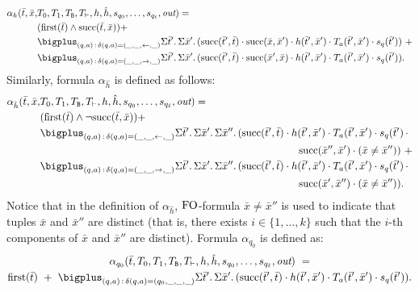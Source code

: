 \begin{align*}
\alpha_{h}(\bar{t},\bar{x},&T_0,T_1,T_{\ttB},T_{\vdash},h,\hat{h},s_{q_0},\ldots,s_{q_{\ell}},\out) = \\
&(\first(\bar{t}) \wedge \successor(\bar{t},\bar{x})) + \\
&\bigplus_{(q,a) \,:\, \delta(q,a) = (\_,\_,\leftarrow,\_)}\sa{\bar{t}'}\sa{\bar{x}'}(\successor(\bar{t}',\bar{t}) \mult \successor(\bar{x},\bar{x}')\mult h(\bar{t}',\bar{x}') \mult T_a(\bar{t}',\bar{x}') \mult s_{q}(\bar{t}')) \ + \\
&\bigplus_{(q,a) \,:\, \delta(q,a) = (\_,\_,\rightarrow,\_)}\sa{\bar{t}'}\sa{\bar{x}'}(\successor(\bar{t}',\bar{t}) \mult \successor(\bar{x}',\bar{x})\mult h(\bar{t}',\bar{x}') \mult T_a(\bar{t}',\bar{x}') \mult s_{q}(\bar{t}')).
\end{align*}
Similarly, formula $\alpha_{\hat{h}}$ is defined as follows:
\begin{align*}
\alpha_{\hat{h}}(\bar{t},\bar{x},&T_0,T_1,T_{\ttB},T_{\vdash},h,\hat{h},s_{q_0},\ldots,s_{q_{\ell}},\out) = \\
&(\first(\bar{t}) \wedge \neg\successor(\bar{t},\bar{x})) + \\
&\bigplus_{(q,a) \,:\, \delta(q,a) = (\_,\_,\leftarrow,\_)}\sa{\bar{t}'}\sa{\bar{x}'}\sa{\bar{x}''}(\successor(\bar{t}',\bar{t}) \mult h(\bar{t}',\bar{x}') \mult T_a(\bar{t}',\bar{x}') \mult s_{q}(\bar{t}') \, \mult \\
&\hspace{250pt} \successor(\bar{x}'',\bar{x}') \mult (\bar{x} \neq \bar{x}'')) \ + \\
&\bigplus_{(q,a) \,:\, \delta(q,a) = (\_,\_,\rightarrow,\_)}\sa{\bar{t}'}\sa{\bar{x}'}\sa{\bar{x}''}(\successor(\bar{t}',\bar{t}) \mult h(\bar{t}',\bar{x}') \mult T_a(\bar{t}',\bar{x}') \mult s_{q}(\bar{t}') \, \mult \\
&\hspace{250pt} \successor(\bar{x}',\bar{x}'') \mult (\bar{x} \neq \bar{x}'')).
\end{align*}
Notice that in the definition of $\alpha_{\hat{h}}$, ${\rm FO}$-formula $\bar{x} \neq \bar{x}''$ is used to indicate that tuples $\bar{x}$ and $\bar{x}''$ are distinct (that is, there exists $i \in \{1, \ldots, k\}$ such that the $i$-th components of $\bar{x}$ and $\bar{x}''$ are distinct). 
Formula $\alpha_{q_0}$ is defined as:
\begin{multline*}
\alpha_{q_0}(\bar{t},T_0,T_1,T_{\ttB},T_{\vdash},h,\hat{h},s_{q_0},\ldots,s_{q_{\ell}},\out) \ = \\ 
\first(\bar{t}) \ + \
\bigplus_{(q,a) \,:\, \delta(q,a) = (q_0,\_,\_,\_)}\sa{\bar{t}'}\sa{\bar{x}'}(\successor(\bar{t}',\bar{t}) \mult h(\bar{t}',\bar{x}') \mult T_a(\bar{t}',\bar{x}') \mult  s_{q}(\bar{t}')).
\end{multline*}
